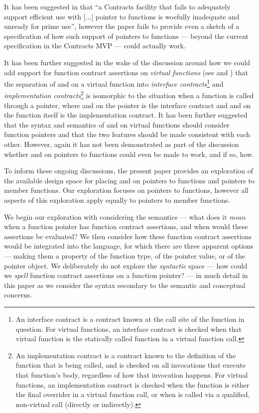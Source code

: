 It has been suggested in \cite{P3173R0} that ``a Contracts facility that fails to adequately support efficient use with [...] pointer to functions is woefully inadequate and unready for prime use'', however the paper fails to provide even a sketch of a specification of how such support of pointers to functions --- beyond the current specification in the Contracts MVP --- could actually work.

It has been further suggested in the wake of the discussion around how we could add support for function contract assertions on \emph{virtual functions} (see \cite{P3097R0} and \cite{P3165R0}) that the separation of  and  on a virtual function into \emph{interface contracts}\footnote{An interface contract is a contract known at the call site of the function in question. For virtual functions, an interface contract is checked when that virtual function is the statically called function in a virtual function call.} and \emph{implementation contracts}\footnote{An implementation contract is a contract known to the definition of the function that is being called, and is checked on all invocations that execute that function's body, regardless of how that invocation happens. For virtual functions, an implementation contract is checked when the function is either the final overrider in a virtual function call, or when is called via a qualified, non-virtual call (directly or indirectly).} is isomorphic to the situation when a function is called through a pointer, where  and  on the pointer is the interface contract and  and  on the function itself is the implementation contract. It has been further suggested that the syntax and semantics of  and  on virtual functions should consider function pointers and that the two features should be made consistent with each other. However, again it has not been demonstrated as part of the discussion whether  and  on pointers to functions could even be made to work, and if so, how.

To inform these ongoing discussions, the present paper provides an exploration of the available design space for placing  and  on pointers to functions and pointers to member functions. Our exploration focuses on pointers to functions, however all aspects of this exploration apply equally to pointers to member functions.

We begin our exploration with considering the semantics --- what does it \emph{mean} when a function pointer has function contract assertions, and when would these assertions be evaluated? We then consider how these function contract assertions would be integrated into the language, for which there are three apparent options --- making them a property of the function type, of the pointer value, or of the pointer object. We deliberately do not explore the \emph{syntactic} space --- how could we \emph{spell} function contract assertions on a function pointer? --- in much detail in this paper as we consider the syntax secondary to the semantic and conceptual concerns. 

